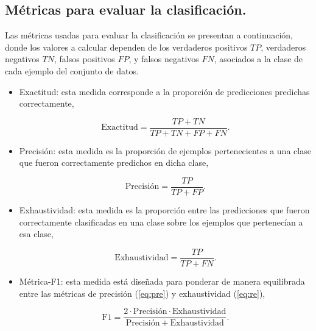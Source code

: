 \subsection{Métricas para evaluar la clasificación.}
Las métricas usadas para evaluar la clasificación se presentan a continuación, donde los valores a calcular dependen de los verdaderos positivos $TP$, verdaderos negativos $TN$, falsos positivos $FP$, y falsos negativos $FN$, asociados a la clase de cada ejemplo del conjunto de datos.


\begin{itemize}
    \item Exactitud: esta medida corresponde a la proporción de predicciones predichas correctamente,

    \begin{equation}
        \mathrm{Exactitud}= \frac{TP+TN}{TP+TN+FP+FN}.
        \label{eq:acc}
    \end{equation}


    \item Precisión: esta medida es la proporción de ejemplos pertenecientes a una clase que fueron correctamente predichos en dicha clase,
    
        \begin{equation}
            \mathrm{Precisión} = \frac{TP}{TP+FP}.
            \label{eq:pre}
        \end{equation}
        
    \item Exhaustividad: esta medida es la proporción entre las predicciones que fueron correctamente clasificadas en una clase sobre los ejemplos que pertenecían a esa clase,
    
    \begin{equation}
        \mathrm{Exhaustividad}= \frac{TP}{TP+FN}.
        \label{eq:re}
    \end{equation}

    \item Métrica-F1: esta medida está diseñada para ponderar de manera equilibrada entre las métricas de precisión (\ref{eq:pre}) y exhaustividad (\ref{eq:re}),
    
    \begin{equation}
        \mathrm{F1} = \frac{2\cdot\mathrm{Precisión}\cdot\mathrm{Exhaustividad}}{\mathrm{Precisión}+\mathrm{Exhaustividad}}.
        \label{eq:f1}
    \end{equation}

\end{itemize}

